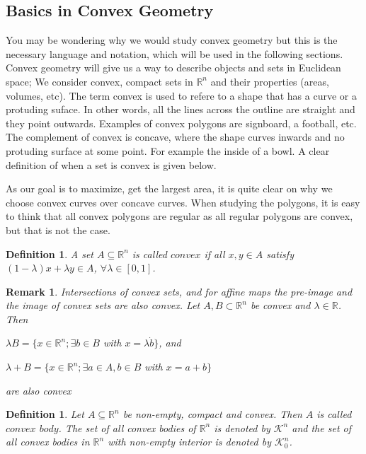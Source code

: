 \documentclass[a4paper]{book}
\newtheorem{remark}[theorem]{Remark}%
\newtheorem{definition}[theorem]{Definition}%
\numberwithin{theorem}{section}%
\begin{document}
\subsection{Basics in Convex Geometry}
You may be wondering why we would study convex geometry but this is the necessary language and notation, which will be used in the following sections. Convex geometry will give us a way to describe objects and sets in Euclidean space; We consider convex, compact sets in $\mathbb{R}^n$ and their properties (areas, volumes, etc). The term convex is used to refere to a shape that has a curve or a protuding suface. In other words, all the lines across the outline are straight and they point outwards. Examples of convex polygons are signboard, a football, etc. The complement of convex is concave, where the shape curves inwards and no protuding surface at some point. For example the inside of a bowl. A clear definition of when a set is convex is given below. 

As our goal is to maximize, get the largest area, it is quite clear on why we choose convex curves over concave curves. When studying the polygons, it is easy to think that all convex polygons are regular as all regular polygons are convex, but that is not the case.
\newline

\begin{definition}
	A set $A\subseteq\mathbb{R}^n$ is called $convex$ if all $x,y\in A$ satisfy $(1-\lambda)x+\lambda y\in A$, $\forall\lambda\in[0,1]$.
\end{definition}

\begin{remark}
	Intersections of convex sets, and for affine maps the pre-image and the image of convex sets are also convex. Let $A, B \subset\mathbb{R}^n$ be convex and $\lambda\in\mathbb{R}$. Then
	\begin{center}
		$\lambda B=\{x\in\mathbb{R}^n;\exists b\in B$ with $x=\lambda\dot b\}$, and
	
		$\lambda+B=\{x\in\mathbb{R}^n;\exists a\in A, b\in B$ with $x=a+b\}$
	\end{center}
	are also convex
\end{remark}

\begin{definition}
	Let $A\subseteq\mathbb{R}^n$ be non-empty, compact and convex. Then $A$ is called $convex$ $body$. The set of all convex bodies of $\mathbb{R}^n$ is denoted by $\mathscr{K}^n$ and the set of all convex bodies in $\mathbb{R}^n$ with non-empty interior is denoted by $\mathscr{K}_{0}^{n}$.
\end{definition}
\end{document}
